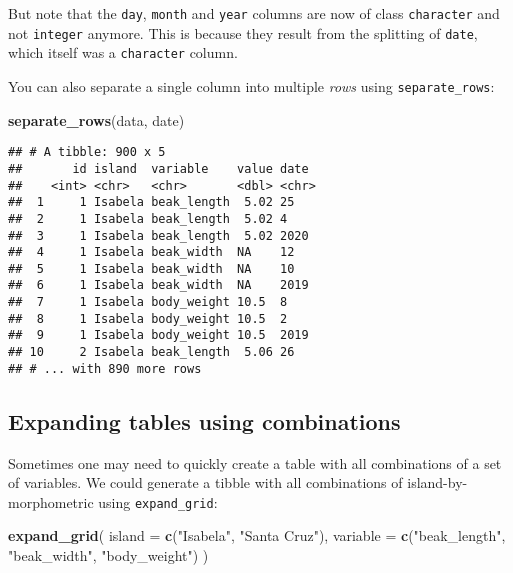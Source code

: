 \documentclass[
]{book}
\newenvironment{Shaded}{}{}
\newcommand{\DataTypeTok}[1]{\textcolor[rgb]{0.56,0.13,0.00}{#1}}
\newcommand{\KeywordTok}[1]{\textcolor[rgb]{0.00,0.44,0.13}{\textbf{#1}}}
\newcommand{\NormalTok}[1]{#1}
\newcommand{\StringTok}[1]{\textcolor[rgb]{0.25,0.44,0.63}{#1}}
\begin{document}
But note that the \texttt{day}, \texttt{month} and \texttt{year} columns are now of class \texttt{character} and not \texttt{integer} anymore. This is because they result from the splitting of \texttt{date}, which itself was a \texttt{character} column.

You can also separate a single column into multiple \emph{rows} using \texttt{separate\_rows}:

\begin{Shaded}
\begin{Highlighting}[]
\KeywordTok{separate_rows}\NormalTok{(data, date)}
\end{Highlighting}
\end{Shaded}

\begin{verbatim}
## # A tibble: 900 x 5
##       id island  variable    value date 
##    <int> <chr>   <chr>       <dbl> <chr>
##  1     1 Isabela beak_length  5.02 25   
##  2     1 Isabela beak_length  5.02 4    
##  3     1 Isabela beak_length  5.02 2020 
##  4     1 Isabela beak_width  NA    12   
##  5     1 Isabela beak_width  NA    10   
##  6     1 Isabela beak_width  NA    2019 
##  7     1 Isabela body_weight 10.5  8    
##  8     1 Isabela body_weight 10.5  2    
##  9     1 Isabela body_weight 10.5  2019 
## 10     2 Isabela beak_length  5.06 26   
## # ... with 890 more rows
\end{verbatim}

\hypertarget{expanding-tables-using-combinations}{%
\subsection{Expanding tables using combinations}\label{expanding-tables-using-combinations}}

Sometimes one may need to quickly create a table with all combinations of a set of variables. We could generate a tibble with all combinations of island-by-morphometric using \texttt{expand\_grid}:

\begin{Shaded}
\begin{Highlighting}[]
\KeywordTok{expand_grid}\NormalTok{(}
  \DataTypeTok{island =} \KeywordTok{c}\NormalTok{(}\StringTok{"Isabela"}\NormalTok{, }\StringTok{"Santa Cruz"}\NormalTok{), }
  \DataTypeTok{variable =} \KeywordTok{c}\NormalTok{(}\StringTok{"beak_length"}\NormalTok{, }\StringTok{"beak_width"}\NormalTok{, }\StringTok{"body_weight"}\NormalTok{)}
\NormalTok{)}
\end{Highlighting}
\end{Shaded}
\end{document}
